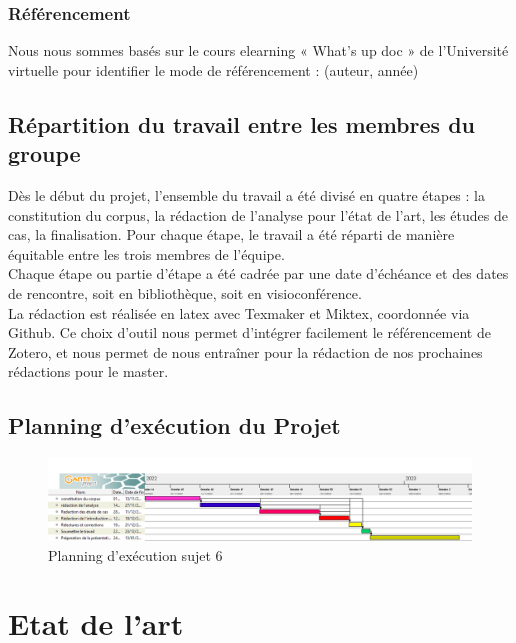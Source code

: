 \documentclass[french,a4paper,12pt]{article}
\begin{document}
\subsubsection{Référencement }
Nous nous sommes basés sur le cours elearning « What’s up doc » de l’Université virtuelle pour identifier le mode de référencement : (auteur, année)

\subsection{Répartition du travail entre les membres du groupe}
\quad Dès le début du projet, l’ensemble du travail a été divisé en quatre étapes : la constitution du corpus, la rédaction de l'analyse pour l’état de l’art, les études de cas, la finalisation. Pour chaque étape, le travail a été réparti de manière équitable entre les trois membres de l’équipe. \\

Chaque étape ou partie d’étape a été cadrée par une date d’échéance et des dates de rencontre, soit en bibliothèque, soit en visioconférence. \\

La rédaction est réalisée en latex avec Texmaker et Miktex, coordonnée via Github. Ce choix d’outil nous permet d’intégrer facilement le référencement de Zotero, et nous permet de nous entraîner pour la rédaction de nos prochaines rédactions pour le master. \\

\subsection{Planning d'exécution du Projet}
\begin{figure}[h]
\begin{center}

\includegraphics[scale=0.4]{document.PNG}
\caption{Planning d'exécution sujet 6}
\end{center}
\end{figure}




\newpage
\section{Etat de l'art}
\end{document}
